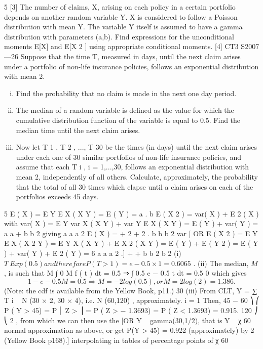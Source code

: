 5
[3]
The number of claims, X, arising on each policy in a certain portfolio depends on
another random variable Y. X is considered to follow a Poisson distribution with
mean Y. The variable Y itself is assumed to have a gamma distribution with
parameters (a,b).
Find expressions for the unconditional moments E[X] and E[X 2 ] using appropriate
conditional moments.
[4]
CT3 S2007—26
Suppose that the time T, measured in days, until the next claim arises under a
portfolio of non-life insurance policies, follows an exponential distribution with
mean 2.
\begin{enumerate}[(i)]
\item Find the probability that no claim is made in the next one day period.
\item The median of a random variable is defined as the value for which the
cumulative distribution function of the variable is equal to 0.5.
Find the median time until the next claim arises.
\item 
Now let T 1 , T 2 , ..., T 30 be the times (in days) until the next claim arises under
each one of 30 similar portfolios of non-life insurance policies, and assume
that each T i , i = 1,...,30, follows an exponential distribution with mean 2,
independently of all others.
Calculate, approximately, the probability that the total of all 30 times which
elapse until a claim arises on each of the portfolios exceeds 45 days.
\end{enumerate}

5
E ( X ) = E Y { E X ( X Y ) } = E ( Y ) =
a
.
b
E ( X 2 ) = var( X ) + E 2 ( X )
with
var( X ) = E Y { var X ( X Y ) } + var Y { E X ( X Y ) }
= E ( Y ) + var( Y ) =
a a
+
b b 2
giving
a a a 2
E ( X ) = + 2 + 2 .
b b
b
2
{
{ var
}
[ OR E ( X 2 ) = E Y E X ( X 2 Y )
= E Y
X
}
( X Y ) + E X 2 ( X Y ) = E ( Y ) + E ( Y 2 )
= E ( Y ) + var( Y ) + E 2 ( Y )
=
6
a a a 2
.]
+ +
b b 2 b 2
(i) $T ~ Exp(0.5) and therefore P ( T > 1) = e − 0.5 × 1 = 0.6065$ .
(ii) The median, $M$, is such that
M
∫
0
M
f ( t ) dt = 0.5 ⇒ ∫ 0.5 e − 0.5 t dt = 0.5
0
which gives
\[1 − e − 0.5 M = 0.5 ⇒ M = − 2 log(0.5) , or M = 2 log(2) = 1.386 .\]
(Note: the cdf is available from the Yellow Book, p11.)
30
(iii)
From CLT, Y = ∑ T i ~ N (30 × 2, 30 × 4), i.e. N (60,120) , approximately.
i = 1
Then,
45 − 60 ⎞
⎛
P ( Y > 45) = P ⎜ Z >
⎟ = P ( Z > − 1.3693) = P ( Z < 1.3693) = 0.915.
120 ⎠
⎝
2
, from which we can then use the
[OR Y ~ gamma(30,1/2), that is Y ~ χ 60
normal approximation as above, or get P(Y > 45) = 0.922 (approximately) by
2
(Yellow Book p168).]
interpolating in tables of percentage points of χ 60
